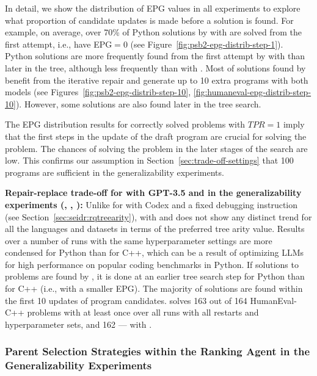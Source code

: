 In detail, we show the distribution of EPG values in all experiments to explore what proportion of candidate updates is made before a solution is found.
For example, on average, over 70\% of Python solutions by \method{} with \gpt{} are solved from the first attempt, i.e., have EPG$=0$ (see Figure~\ref{fig:psb2-epg-distrib-step-1}).
Python solutions are more frequently found from the first attempt by \method{} with \llama{} than later in the tree, although less frequently than with \gpt{}.
Most of solutions found by \method{} benefit from the iterative repair and generate up to 10 extra programs with both models (see Figures~\ref{fig:psb2-epg-distrib-step-10}, \ref{fig:humaneval-epg-distrib-step-10}). 
However, some solutions are also found later in the tree search. 

The EPG distribution results for correctly solved problems with $TPR=1$ imply that the first steps in the update of the draft program are crucial for solving the problem. 
The chances of solving the problem in the later stages of the search are low.
This confirms our assumption in Section~\ref{sec:trade-off-settings} that 100 programs are sufficient in the generalizability experiments.

\begin{framed}\noindent
\textbf{Repair-replace trade-off for \method{} with GPT-3.5 and \llama{} in the generalizability experiments (\rqtreearity{}, \rqllama{}, \rqmultirun{}):}
Unlike for \method{} with Codex and a fixed debugging instruction (see Section~\ref{sec:seidr:rqtreearity}), \method{} with \gpt{} and \llama{} does not show any distinct trend for all the languages and datasets in terms of the preferred tree arity value. 
Results over a number of runs with the same hyperparameter settings are more condensed for Python than for C++, which can be a result of optimizing LLMs for high performance on popular coding benchmarks in Python.
If solutions to problems are found by \method{}, it is done at an earlier tree search step for Python than for C++ (i.e., with a smaller EPG). 
The majority of solutions are found within the first 10 updates of program candidates. 
\method{} solves 163 out of 164 HumanEval-C++ problems with \gpt{} at least once over all runs with all restarts and hyperparameter sets, and 162 --- with \llama{}.
\end{framed}



\subsubsection{Parent Selection Strategies within the Ranking Agent in the Generalizability Experiments}
\label{sec:lexicase-results}


